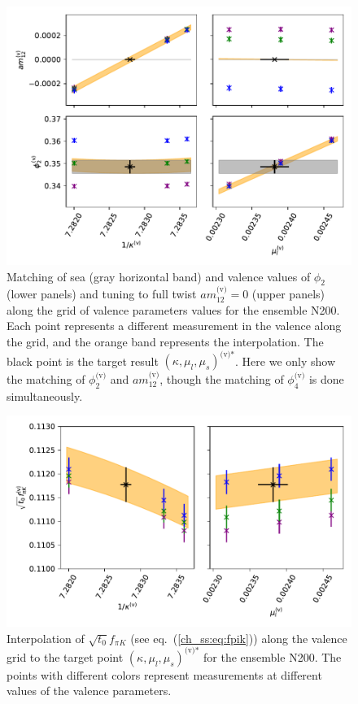 \begin{figure}
    \centering
    \includegraphics[width=1.\textwidth]{./cap4/figs/matching_N200.pdf}
    \caption{Matching of sea (gray horizontal band) and valence values of $\phi_2$ (lower panels) and tuning to full twist $am_{12}^{\textrm{(v)}}=0$ (upper panels) along the grid of valence parameters values for the ensemble N200. Each point represents a different measurement in the valence along the grid, and the orange band represents the interpolation. The black point is the target result $\left(\kappa,\mu_l,\mu_s\right)^{\textrm{(v)*}}$. Here we only show the matching of $\phi_2^{\textrm{(v)}}$ and $am_{12}^{\textrm{(v)}}$, though the matching of $\phi_4^{\textrm{(v)}}$ is done simultaneously.}
    \label{ch_ma:fig:match}
\end{figure}

\begin{figure}
    \centering
    \includegraphics[width=1.\textwidth]{./cap4/figs/interp_fpik_N200.pdf}
    \caption{Interpolation of $\sqrt{t_0}f_{\pi K}$ (see eq.~(\ref{ch_ss:eq:fpik})) along the valence grid to the target point $\left(\kappa,\mu_l,\mu_s\right)^{\textrm{(v)*}}$ for the ensemble N200. The points with different colors represent measurements at different values of the valence parameters.}
    \label{ch_ma:fig:fpik_interp}
  \end{figure}

